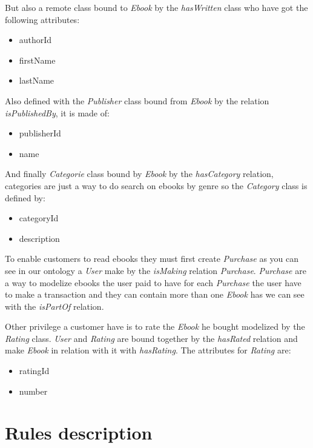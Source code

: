 \documentclass[a4paper,11pt]{article}
\begin{document}
But also a remote  class bound to \emph{Ebook} by the \emph{hasWritten} class who have got the
following attributes:

\begin{itemize}
  \item authorId
  \item firstName
  \item lastName
\end{itemize}

Also defined with the \emph{Publisher} class bound from \emph{Ebook} by the relation \emph{isPublishedBy},
it is made of:

\begin{itemize}
  \item publisherId
  \item name
\end{itemize}

And finally \emph{Categorie} class bound by \emph{Ebook} by the \emph{hasCategory} relation, categories are just
a way to do search on ebooks by genre so the \emph{Category} class is defined by:

\begin{itemize}
  \item categoryId
  \item description
\end{itemize}

To enable customers to read ebooks they must first create \emph{Purchase} as you can see in our ontology a \emph{User}
make by the \emph{isMaking} relation \emph{Purchase}. \emph{Purchase} are a way to modelize ebooks the user paid to have
for each \emph{Purchase} the user have to make a transaction and they can contain more than one \emph{Ebook} has we can
see with the \emph{isPartOf} relation.

Other privilege a customer have is to rate the \emph{Ebook} he bought modelized by the \emph{Rating} class.
\emph{User} and \emph{Rating} are bound together by the \emph{hasRated} relation and make \emph{Ebook} in relation
with it with \emph{hasRating}. The attributes for \emph{Rating} are:

\begin{itemize}
  \item ratingId
  \item number
\end{itemize}

\section{Rules description}
\end{document}
